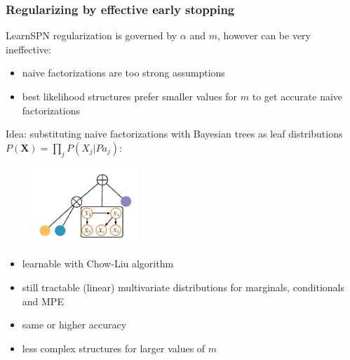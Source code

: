 \documentclass[xcolor={usenames,dvipsnames,svgnames}, compress]{beamer}
\begin{document}
\begin{frame}
  \frametitle{Regularizing by effective early stopping}
  \footnotesize
  LearnSPN regularization is governed by $\alpha$ and $m$, however can
  be very ineffective:
  \begin{itemize}
  \item naive factorizations are too strong assumptions
    \item best likelihood structures prefer smaller values for $m$ to
      get accurate naive factorizations
    \end{itemize}\bigskip
    
    
    Idea: substituting naive factorizations with Bayesian trees as leaf
    distributions $P(\mathbf{X}) = \prod_{j}P(X_j|Pa_{j})$:
    \begin{figure}
      \vspace{-20pt}
      \begin{center}
        \includegraphics[width=0.35\textwidth]{figures/spn-clt}
      \end{center}
      \vspace{-20pt}
    \end{figure}
    \begin{itemize}
    \item learnable with Chow-Liu algorithm
    \item still tractable (linear) multivariate distributions for marginals,
      conditionals and MPE
    \item same or higher accuracy
    \item less complex structures for larger values of $m$
    \end{itemize}
\end{frame}
\end{document}
